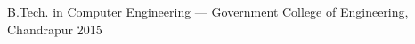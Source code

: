 \documentclass[11pt, a4paper]{awesome-cv}
\begin{document}
\begin{cventries}
  \cventry
    {}
    {B.Tech. in Computer Engineering — Government College of Engineering, Chandrapur}
    {2015}
    {}
    {}
\end{cventries}
\end{document}
